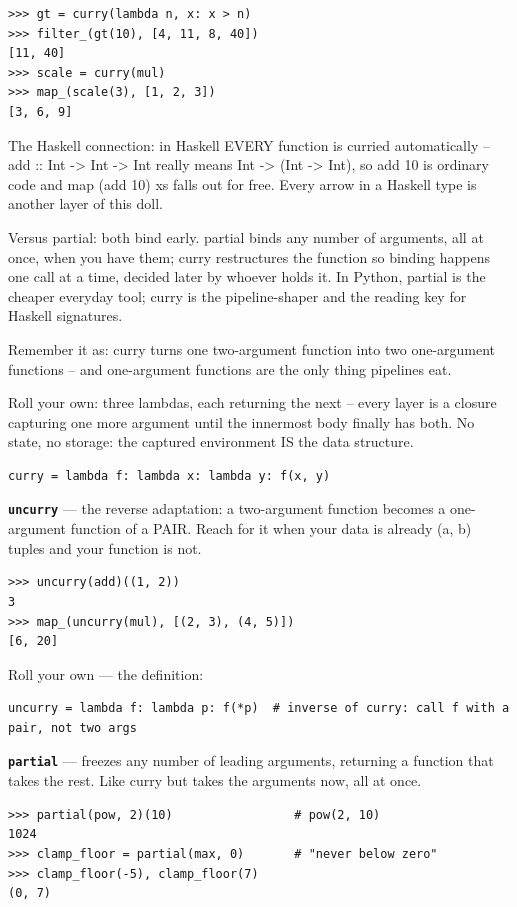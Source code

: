 \documentclass[10pt,letterpaper]{article}
\begin{document}
\begin{lstlisting}[style=ex]
>>> gt = curry(lambda n, x: x > n)
>>> filter_(gt(10), [4, 11, 8, 40])
[11, 40]
>>> scale = curry(mul)
>>> map_(scale(3), [1, 2, 3])
[3, 6, 9]
\end{lstlisting}

The Haskell connection: in Haskell EVERY function is curried automatically -- add :: Int -> Int -> Int really means Int -> (Int -> Int), so add 10 is ordinary code and map (add 10) xs falls out for free. Every arrow in a Haskell type is another layer of this doll.


Versus partial: both bind early. partial binds any number of arguments, all at once, when you have them; curry restructures the function so binding happens one call at a time, decided later by whoever holds it. In Python, partial is the cheaper everyday tool; curry is the pipeline-shaper and the reading key for Haskell signatures.


Remember it as: curry turns one two-argument function into two one-argument functions -- and one-argument functions are the only thing pipelines eat.


Roll your own: three lambdas, each returning the next -- every layer is a closure capturing one more argument until the innermost body finally has both. No state, no storage: the captured environment IS the data structure.

\begin{lstlisting}[style=ex]
curry = lambda f: lambda x: lambda y: f(x, y)
\end{lstlisting}
\textbf{\texttt{uncurry}} --- the reverse adaptation: a two-argument function becomes a one-argument function of a PAIR. Reach for it when your data is already (a, b) tuples and your function is not.
\begin{lstlisting}[style=ex]
>>> uncurry(add)((1, 2))
3
>>> map_(uncurry(mul), [(2, 3), (4, 5)])
[6, 20]
\end{lstlisting}

Roll your own --- the definition:

\begin{lstlisting}[style=ex]
uncurry = lambda f: lambda p: f(*p)  # inverse of curry: call f with a pair, not two args
\end{lstlisting}
\textbf{\texttt{partial}} --- freezes any number of leading arguments, returning a function that takes the rest. Like curry but takes the arguments now, all at once.
\begin{lstlisting}[style=ex]
>>> partial(pow, 2)(10)                 # pow(2, 10)
1024
>>> clamp_floor = partial(max, 0)       # "never below zero"
>>> clamp_floor(-5), clamp_floor(7)
(0, 7)
\end{lstlisting}
\end{document}
